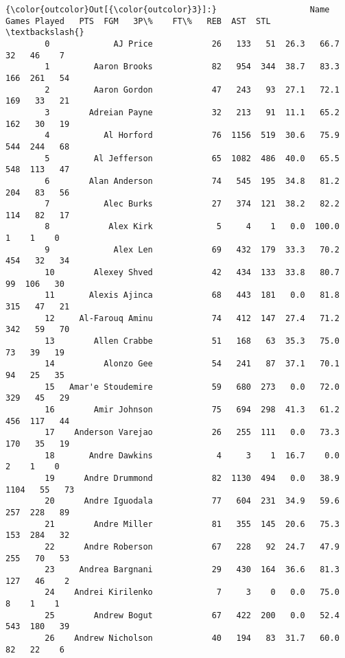 \documentclass[11pt]{article}
\begin{document}
\begin{Verbatim}[commandchars=\\\{\}]
{\color{outcolor}Out[{\color{outcolor}3}]:}                   Name  Games Played   PTS  FGM   3P\%    FT\%   REB  AST  STL  \textbackslash{}
        0             AJ Price            26   133   51  26.3   66.7    32   46    7   
        1         Aaron Brooks            82   954  344  38.7   83.3   166  261   54   
        2         Aaron Gordon            47   243   93  27.1   72.1   169   33   21   
        3        Adreian Payne            32   213   91  11.1   65.2   162   30   19   
        4           Al Horford            76  1156  519  30.6   75.9   544  244   68   
        5         Al Jefferson            65  1082  486  40.0   65.5   548  113   47   
        6        Alan Anderson            74   545  195  34.8   81.2   204   83   56   
        7           Alec Burks            27   374  121  38.2   82.2   114   82   17   
        8            Alex Kirk             5     4    1   0.0  100.0     1    1    0   
        9             Alex Len            69   432  179  33.3   70.2   454   32   34   
        10        Alexey Shved            42   434  133  33.8   80.7    99  106   30   
        11       Alexis Ajinca            68   443  181   0.0   81.8   315   47   21   
        12     Al-Farouq Aminu            74   412  147  27.4   71.2   342   59   70   
        13        Allen Crabbe            51   168   63  35.3   75.0    73   39   19   
        14          Alonzo Gee            54   241   87  37.1   70.1    94   25   35   
        15   Amar'e Stoudemire            59   680  273   0.0   72.0   329   45   29   
        16        Amir Johnson            75   694  298  41.3   61.2   456  117   44   
        17    Anderson Varejao            26   255  111   0.0   73.3   170   35   19   
        18       Andre Dawkins             4     3    1  16.7    0.0     2    1    0   
        19      Andre Drummond            82  1130  494   0.0   38.9  1104   55   73   
        20      Andre Iguodala            77   604  231  34.9   59.6   257  228   89   
        21        Andre Miller            81   355  145  20.6   75.3   153  284   32   
        22      Andre Roberson            67   228   92  24.7   47.9   255   70   53   
        23     Andrea Bargnani            29   430  164  36.6   81.3   127   46    2   
        24    Andrei Kirilenko             7     3    0   0.0   75.0     8    1    1   
        25        Andrew Bogut            67   422  200   0.0   52.4   543  180   39   
        26    Andrew Nicholson            40   194   83  31.7   60.0    82   22    6   

\end{Verbatim}
\end{document}
